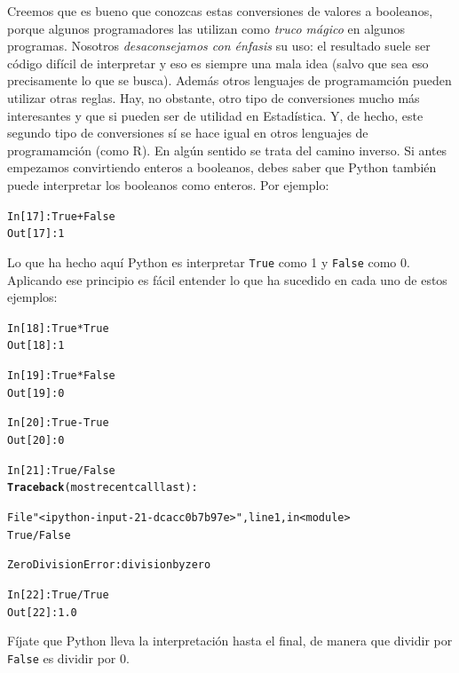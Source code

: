 \documentclass[10pt,a4paper]{article}\usepackage[]{graphicx}\usepackage[]{color}
\makeatletter
\newcommand{\hlnum}[1]{\textcolor[rgb]{0.686,0.059,0.569}{#1}}%
\newcommand{\hlstr}[1]{\textcolor[rgb]{0.192,0.494,0.8}{#1}}%
\newcommand{\hlopt}[1]{\textcolor[rgb]{0,0,0}{#1}}%
\newcommand{\hlstd}[1]{\textcolor[rgb]{0.345,0.345,0.345}{#1}}%
\newcommand{\hlkwd}[1]{\textcolor[rgb]{0.737,0.353,0.396}{\textbf{#1}}}%
\newenvironment{kframe}{%
 \def\at@end@of@kframe{}%
 \ifinner\ifhmode%
  \def\at@end@of@kframe{\end{minipage}}%
  \begin{minipage}{\columnwidth}%
 \fi\fi%
 \def\FrameCommand##1{\hskip\@totalleftmargin \hskip-\fboxsep
 \colorbox{shadecolor}{##1}\hskip-\fboxsep
     \hskip-\linewidth \hskip-\@totalleftmargin \hskip\columnwidth}%
 \MakeFramed {\advance\hsize-\width
   \@totalleftmargin\z@ \linewidth\hsize
   \@setminipage}}%
 {\par\unskip\endMakeFramed%
 \at@end@of@kframe}
\newenvironment{knitrout}{}{} %
\makeatother
\begin{document}
Creemos que es bueno que conozcas estas conversiones de valores a booleanos, porque  algunos programadores las utilizan como {\em truco mágico} en algunos programas. Nosotros {\em desaconsejamos con énfasis} su uso: el resultado suele ser código difícil de interpretar y eso es siempre una mala idea (salvo que sea eso precisamente lo que se busca). Además otros lenguajes de programamción pueden utilizar otras reglas. Hay, no obstante, otro tipo de conversiones mucho más interesantes y que si pueden ser de utilidad en Estadística. Y, de hecho, este segundo tipo de conversiones sí se hace igual en otros lenguajes de programamción (como R). En algún sentido se trata del camino inverso. Si antes empezamos convirtiendo enteros a booleanos, debes saber que Python también puede interpretar los booleanos como enteros. Por ejemplo:
\begin{knitrout}
\color{fgcolor}\begin{kframe}
\begin{alltt}
\hlstd{In [}\hlnum{17}\hlstd{]}\hlopt{:} \hlstd{True} \hlopt{+} \hlstd{False}
\hlstd{Out[}\hlnum{17}\hlstd{]}\hlopt{:} \hlnum{1}
\end{alltt}
\end{kframe}
\end{knitrout}
Lo que ha hecho aquí Python es interpretar {\tt True} como 1 y {\tt False} como 0. Aplicando ese principio es fácil entender lo que ha sucedido en cada uno de estos ejemplos:
\begin{knitrout}
\color{fgcolor}\begin{kframe}
\begin{alltt}
In [18]: True * True
Out[18]: 1

In [19]: True * False
Out[19]: 0

In [20]: True - True
Out[20]: 0

In [21]: True / False
\hlkwd{Traceback} (most recent call last):

  File \hlstr{"<ipython-input-21-dcacc0b7b97e>"}, line 1, in <module>
    True / False

ZeroDivisionError: division by zero


In [22]: True / True
Out[22]: 1.0
\end{alltt}
\end{kframe}
\end{knitrout}
Fíjate que Python lleva la interpretación hasta el final, de manera que dividir por {\tt False} es dividir por 0.
\end{document}
